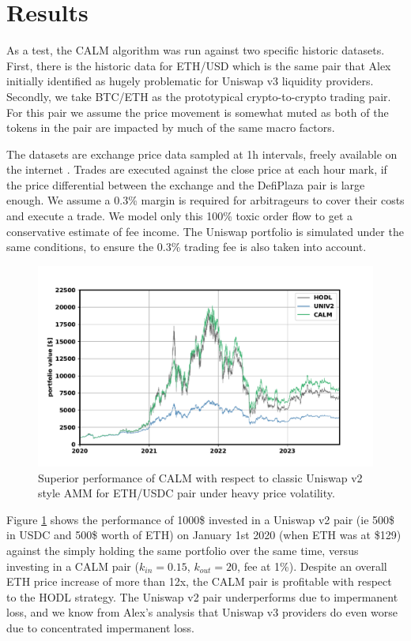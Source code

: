 \documentclass [10pt, twoside] {article}
\begin{document}
\section{Results} \label{sec:results}
As a test, the CALM algorithm was run against two specific historic datasets. First, there is the historic data for ETH/USD which is the same pair that Alex initially identified as hugely problematic for Uniswap v3 liquidity providers. Secondly, we take BTC/ETH as the prototypical crypto-to-crypto trading pair. For this pair we assume the price movement is somewhat muted as both of the tokens in the pair are impacted by much of the same macro factors.

The datasets are exchange price data sampled at 1h intervals, freely available on the internet \cite{data}. Trades are executed against the close price at each hour mark, if the price differential between the exchange and the DefiPlaza pair is large enough. We assume a 0.3\% margin is required for arbitrageurs to cover their costs and execute a trade. We model only this 100\% toxic order flow to get a conservative estimate of fee income. The Uniswap portfolio is simulated under the same conditions, to ensure the 0.3\% trading fee is also taken into account.

\begin{figure}[!htbp]
\centering
\includegraphics[width=\textwidth,keepaspectratio]{figures/ETH_USD.pdf}
\caption{Superior performance of CALM with respect to classic Uniswap v2 style AMM for ETH/USDC pair under heavy price volatility.}
\label{fig:resultgraph}
\end{figure}

Figure \ref{fig:resultgraph} shows the performance of 1000\$ invested in a Uniswap v2 pair (ie 500\$ in USDC and 500\$ worth of ETH) on January 1st 2020 (when ETH was at \$129) against the simply holding the same portfolio over the same time, versus investing in a CALM pair ($k_{in}=0.15$, $k_{out}=20$, fee at 1\%). Despite an overall ETH price increase of more than 12x, the CALM pair is profitable with respect to the HODL strategy. The Uniswap v2 pair underperforms due to impermanent loss, and we know from Alex's analysis that Uniswap v3 providers do even worse due to concentrated impermanent loss.
\end{document}

